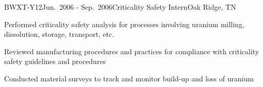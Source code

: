 






\begin{rSubsection}{BWXT-Y12}{Jun.\ 2006 - Sep.\ 2006}{Criticality Safety Intern}{Oak Ridge, TN}
\item Performed criticality safety analysis for processes involving uranium milling, dissolution, storage, transport, etc.
\item Reviewed manufacturing procedures and practices for compliance with criticality safety guidelines and procedures
\item Conducted material surveys to track and monitor build-up and loss of uranium
\end{rSubsection}





